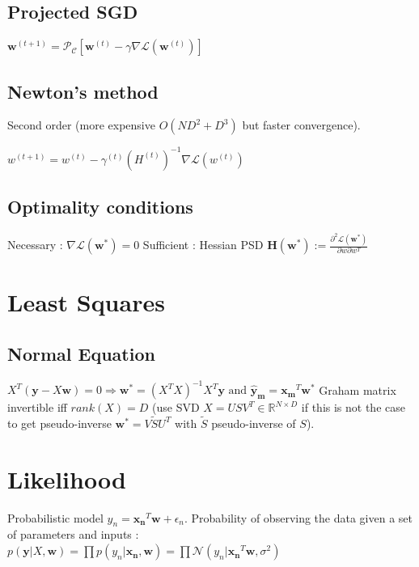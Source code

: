 \subsection{Projected SGD}

$\mathbf{w}^{(t+1)} = \mathcal{P_C} [\mathbf{w}^{(t)} - \gamma \nabla \mathcal{L}(\mathbf{w}^{(t)})]$

\subsection{Newton's method}
Second order (more expensive $O(ND^2 + D^3)$ but faster convergence).

$w^{(t+1)} = w^{(t)} - \gamma^{(t)} (H^{(t)})^{-1} \nabla \mathcal{L}(w^{(t)})$


\subsection{Optimality conditions}
Necessary : $\nabla \mathcal{L} (\mathbf{w}^*) = 0$
Sufficient : Hessian PSD $\mathbf{H}(\mathbf{w}^*) := \frac{\partial^2 \mathcal{L}(\mathbf{w}^*)}{\partial w \partial w^T}$


\section{Least Squares}
\subsection{Normal Equation}
$X^T (\mathbf{y} - X\mathbf{w})= 0 \Rightarrow$\newline$\mathbf{w^*} = (X^TX)^{-1}X^T\mathbf{y} \text{ and } \mathbf{\hat{y}_m} = \mathbf{x_m}^T \mathbf{w^*}$
Graham matrix invertible iff $rank(X) = D$ (use SVD $X = USV^T \in \mathbb{R}^{N\times D}$ if this is not the case to get pseudo-inverse $\mathbf{w^*} = V\tilde{S}U^T$ with $\tilde{S}$ pseudo-inverse of $S$).

\section{Likelihood}
Probabilistic model $y_n = \mathbf{x_n}^T\mathbf{w} + \epsilon_n$.
Probability of observing the data given a set of parameters and inputs :
$p(\mathbf{y}|X, \mathbf{w}) = \prod p(y_n|\mathbf{x_n}, \mathbf{w})  = \prod \mathcal{N} (y_n | \mathbf{x_n}^T\mathbf{w}, \sigma^2)$

